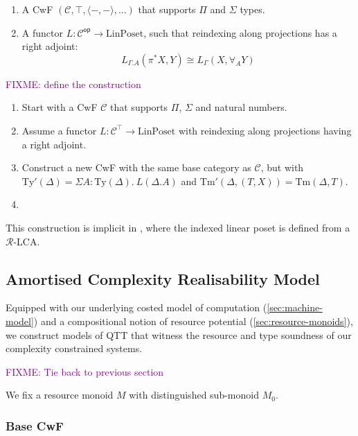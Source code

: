 \documentclass[acmsmall,review]{acmart}
\newcommand{\Ty}{\mathrm{Ty}}
\newcommand{\Tm}{\mathrm{Tm}}
\newcommand{\cat}[1]{\mathcal{#1}}
\newcommand{\op}{\mathsf{op}}
\newcommand{\LinPoset}{\mathrm{LinPoset}}
\newcommand{\bob}[1]{\textcolor{purple}{FIXME: #1}}
\begin{document}
\begin{definition}
  \begin{enumerate}
  \item A CwF $(\cat{C}, \top, \langle-,-\rangle, ...)$ that supports
    $\Pi$ and $\Sigma$ types.
  \item A functor $L : \cat{C}^\op \to \LinPoset$, such that
    reindexing along projections has a right adjoint:
    \begin{displaymath}
      L_{\Gamma.A}(\pi^*X, Y) \cong L_{\Gamma}(X, \forall_A Y)
    \end{displaymath}
  \end{enumerate}
\end{definition}

\bob{define the construction}
\begin{enumerate}
\item Start with a CwF $\cat{C}$ that supports $\Pi$, $\Sigma$ and
  natural numbers.
\item Assume a functor $L : \cat{C}^\top \to \LinPoset$ with
  reindexing along projections having a right adjoint.
\item Construct a new CwF with the same base category as $\cat{C}$,
  but with $\Ty'(\Delta) = \Sigma A : \Ty(\Delta).~L(\Delta.A)$ and
  $\Tm'(\Delta, (T, X)) = \Tm(\Delta, T)$.
\item
\end{enumerate}

This construction is implicit in \cite{atkey2018qtt}, where the
indexed linear poset is defined from a $\mathcal{R}$-LCA.


\subsection{Amortised Complexity Realisability Model}
\label{sec:realisability-model}

Equipped with our underlying costed model of computation
(\autoref{sec:machine-model}) and a compositional notion of resource
potential (\autoref{sec:resource-monoids}), we construct models of QTT
that witness the resource and type soundness of our complexity
constrained systems.

\bob{Tie back to previous section}

We fix a resource monoid $M$ with distinguished sub-monoid $M_0$.

\subsubsection{Base CwF}
\label{sec:realisability-base-cwf}
\end{document}
